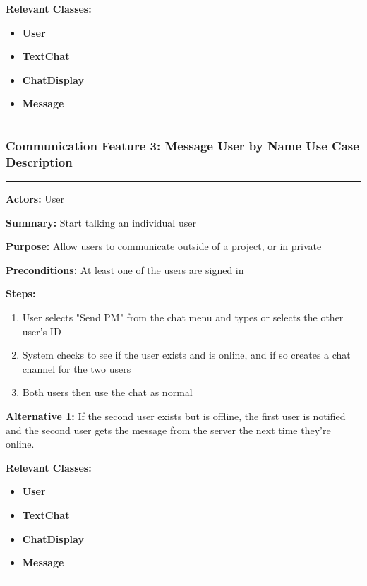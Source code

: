 \documentclass[twoside,letterpaper]{article}
\begin{document}
\noindent\textbf{Relevant Classes:}
\begin{itemize}
	\item \textbf{User}
	\item \textbf{TextChat}
	\item \textbf{ChatDisplay}
	\item \textbf{Message}
\end{itemize}
\hrule
\newpage

\subsubsection[Communication Feature 3: Message User by Name Use Case Description]{\rmfamily\bfseries\color{black}
	Communication Feature 3: Message User by Name Use Case Description}
\hypertarget{RefHeading22059017292}{}

\vspace{2pt}
\hrule
\vspace{8pt}
\textbf{Actors:} User \newline

\noindent\textbf{Summary:} Start talking an individual user \newline

\noindent\textbf{Purpose:} Allow users to communicate outside of a project, or in private \newline

\noindent\textbf{Preconditions:} At least one of the users are signed in \newline

\noindent\textbf{Steps:} \begin{enumerate}
	\item User selects "Send PM" from the chat menu and types or selects the other user's ID
	\item System checks to see if the user exists and is online, and if so creates a chat channel for the two users
	\item Both users then use the chat as normal
\end{enumerate}
\noindent\textbf{Alternative 1:} If the second user exists but is offline, the first user is notified and the second user gets the message from the server the next time they're online. \newline


\noindent\textbf{Relevant Classes:}
\begin{itemize}
	\item \textbf{User}
	\item \textbf{TextChat}
	\item \textbf{ChatDisplay}
	\item \textbf{Message}
\end{itemize}
\hrule
\newpage
\end{document}
